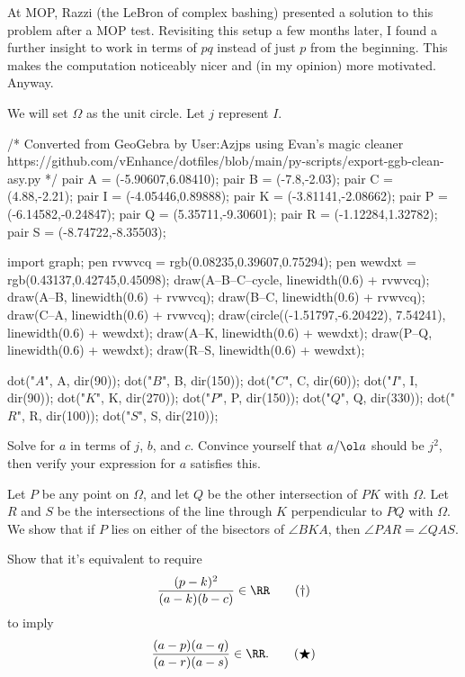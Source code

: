 \documentclass[11pt]{scrartcl}
\begin{document}
\begin{walkthrough}
	At MOP, Razzi (the LeBron of complex bashing) presented a solution to this problem after a MOP test. Revisiting this setup a few months later, I found a further insight to work in terms of $pq$ instead of just $p$ from the beginning. This makes the computation noticeably nicer and (in my opinion) more motivated. Anyway.

	We will set $\Omega$ as the unit circle. Let $j$ represent $I$.
	\begin{center}
		\begin{asy}
		/*
		Converted from GeoGebra by User:Azjps using Evan's magic cleaner
		https://github.com/vEnhance/dotfiles/blob/main/py-scripts/export-ggb-clean-asy.py
		*/
		pair A = (-5.90607,6.08410);
		pair B = (-7.8,-2.03);
		pair C = (4.88,-2.21);
		pair I = (-4.05446,0.89888);
		pair K = (-3.81141,-2.08662);
		pair P = (-6.14582,-0.24847);
		pair Q = (5.35711,-9.30601);
		pair R = (-1.12284,1.32782);
		pair S = (-8.74722,-8.35503);
		
		import graph;
		pen rvwvcq = rgb(0.08235,0.39607,0.75294);
		pen wewdxt = rgb(0.43137,0.42745,0.45098);
		draw(A--B--C--cycle, linewidth(0.6) + rvwvcq);
		draw(A--B, linewidth(0.6) + rvwvcq);
		draw(B--C, linewidth(0.6) + rvwvcq);
		draw(C--A, linewidth(0.6) + rvwvcq);
		draw(circle((-1.51797,-6.20422), 7.54241), linewidth(0.6) + wewdxt);
		draw(A--K, linewidth(0.6) + wewdxt);
		draw(P--Q, linewidth(0.6) + wewdxt);
		draw(R--S, linewidth(0.6) + wewdxt);
		
		dot("$A$", A, dir(90));
		dot("$B$", B, dir(150));
		dot("$C$", C, dir(60));
		dot("$I$", I, dir(90));
		dot("$K$", K, dir(270));
		dot("$P$", P, dir(150));
		dot("$Q$", Q, dir(330));
		dot("$R$", R, dir(100));
		dot("$S$", S, dir(210));
		\end{asy}
	\end{center}
	\begin{walk}
		\ii Solve for $a$ in terms of $j$, $b$, and $c$. Convince yourself that $a/\ol a$ should be $j^2$, then verify your expression for $a$ satisfies this.
	\end{walk}

	Let $P$ be any point on $\Omega$, and let $Q$ be the other intersection of $PK$ with $\Omega$.
	Let $R$ and $S$ be the intersections of the line through $K$ perpendicular to $PQ$ with $\Omega$. 
	We show that if $P$ lies on either of the bisectors of $\angle BKA$, then $\angle PAR = \angle QAS$.

	\begin{walk}[resume]
		\ii Show that it's equivalent to require
		\[\frac{(p - k)^2}{(a - k)(b - c)} \in \RR \tag{$\dagger$}\]
		to imply
		\[\frac{(a - p)(a - q)}{(a - r)(a - s)} \in \RR. \tag{$\bigstar$}\]
	\end{walk}


\end{walkthrough}
\end{document}
